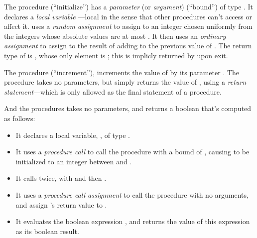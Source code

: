 The procedure  (``initialize'') has a \emph{parameter} (or
\emph{argument})  (``bound'') of type . It declares a
\emph{local variable} ---local in the sense that other
procedures can't access or affect it.  uses a \emph{random
  assignment} to assign to  an integer chosen uniformly from the
integers whose absolute values are at most . It then uses an
\emph{ordinary assignment} to assign to  the result of adding
 to the previous value of .  The return type of 
is , whose only element is ; this is implicly returned
by  upon exit.

The procedure  (``increment''), increments the value of
 by its parameter . The procedure  takes no
parameters, but simply returns the value of , using
a \emph{return statement}---which is only allowed as the
final statement of a procedure.

And the  procedures takes no parameters, and returns a boolean
that's computed as follows:
\begin{itemize}
\item It declares a local variable, , of type .

\item It uses a \emph{procedure call} to call the procedure 
  with a bound of , causing  to be initialized to an
  integer between  and .

\item It calls  twice, with  and then .

\item It uses a \emph{procedure call assignment} to call the procedure
   with no arguments, and assign 's return value to .

\item It evaluates the boolean expression , and returns
  the value of this expression as its boolean result.
\end{itemize}


